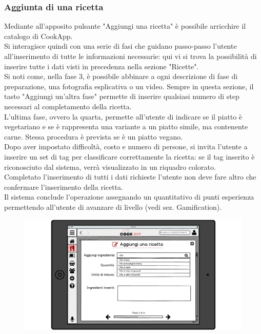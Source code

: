 \subsubsection{Aggiunta di una ricetta}
Mediante all'apposito pulsante "Aggiungi una ricetta" è possibile arricchire il catalogo di CookApp.\\
Si interagisce quindi con una serie di fasi che guidano passo-passo l'utente all'inserimento di tutte le informazioni necessarie: qui vi si trova la possibilità di inserire tutte i dati visti in precedenza nella sezione "Ricette".\\
Si noti come, nella fase 3, è possibile abbinare a ogni descrizione di fase di preparazione, una fotografia esplicativa o un video. Sempre in questa sezione, il tasto "Aggiungi un'altra fase" permette di inserire qualsiasi numero di step necessari al completamento della ricetta.\\
L'ultima fase, ovvero la quarta, permette all'utente di indicare se il piatto è vegetariano e se è rappresenta una variante a un piatto simile, ma contenente carne. Stessa procedura è prevista se è un piatto vegano.\\
Dopo aver impostato difficoltà, costo e numero di persone, si invita l'utente a inserire un set di tag per classificare correttamente la ricetta: se il tag inserito è riconosciuto dal sistema, verrà visualizzato in un riquadro colorato.\\
Completato l'inserimento di tutti i dati richieste l'utente non deve fare altro che confermare l'inserimento della ricetta.\\
Il sistema conclude l'operazione assegnando un quantitativo di punti esperienza permettendo all'utente di avanzare di livello (vedi sez. Gamification).\\
\begin{figure}[H]
	\centering
	\includegraphics[width=0.95\linewidth]{img/mockup/Aggiungi-ricetta.png}
\end{figure}

